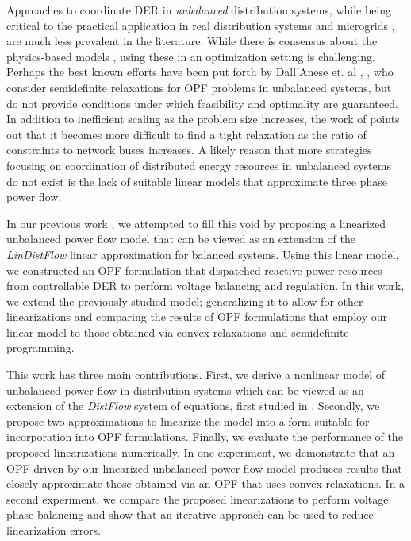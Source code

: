 Approaches to coordinate DER in \emph{unbalanced} distribution systems, while being critical to the practical application in real distribution systems and microgrids \cite{doe2015ADMS}, are much less prevalent in the literature.  
While there is consensus about the physics-based models \cite{kersting2012distribution}, using these in an optimization setting is challenging. Perhaps the best known efforts have been put forth by Dall'Anese et. al \cite{dall2012optimization}, \cite{dall2013distributed}, who consider semidefinite relaxations for OPF problems in unbalanced systems, but do not provide conditions under which feasibility and optimality are guaranteed.  In addition to inefficient scaling as the problem size increases, the work of \cite{bitar2014} points out that it becomes more difficult to find a tight relaxation as the ratio of constraints to network buses increases.  A likely reason that more strategies focusing on coordination of distributed energy resources in unbalanced systems do not exist is the lack of suitable linear models that approximate three phase power flow. 

In our previous work \cite{arnold2015optimal}, we attempted to fill this void by proposing a linearized unbalanced power flow model that can be viewed as an extension of the \emph{LinDistFlow} \cite{baran1989optimal} linear approximation for balanced systems.  Using this linear model, we constructed an OPF formulation that dispatched reactive power resources from controllable DER to perform voltage balancing and regulation.  In this work, we extend the previously studied model; generalizing it to allow for other linearizations and comparing the results of OPF formulations that employ our linear model to those obtained via convex relaxations and semidefinite programming.

This work has three main contributions.  First, we derive a nonlinear model of unbalanced power flow in distribution systems which can be viewed as an extension of the \emph{DistFlow} system of equations, first studied in \cite{baran1989optimal}.  Secondly, we propose two approximations to linearize the model into a form suitable for incorporation into OPF formulations.  Finally, we evaluate the performance of the proposed linearizations numerically.  In one experiment, we demonstrate that an OPF driven by our linearized unbalanced power flow model produces results that closely approximate those obtained via an OPF that uses convex relaxations.  In a second experiment, we compare the proposed linearizations to perform voltage phase balancing and show that an iterative approach can be used to reduce linearization errors.

